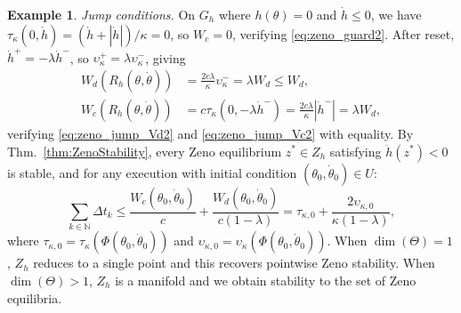 \documentclass[letterpaper, 10 pt, conference]{IEEEconf}
\theoremstyle{definition}
\newtheorem{example}[thm]{Example}
\newcommand{\N}{\mathbb N}
\begin{document}
\begin{example}
    \textit{Jump conditions.} On $G_h$ where $h(\theta) = 0$ and $\dot{h} \leq 0$, we have $\tau_\kappa(0, \dot{h}) = (\dot{h} + |\dot{h}|)/\kappa = 0$, so $W_c = 0$, verifying \eqref{eq:zeno_guard2}. After reset, $\dot{h}^+ = -\lambda\dot{h}^-$, so $\upsilon_\kappa^+ = \lambda\upsilon_\kappa^-$, giving
    \begin{align*}
        W_d(R_h(\theta, \dot\theta)) &= \frac{2c\lambda}{\kappa}\upsilon_\kappa^- = \lambda W_d \leq W_d,  \\
        W_c(R_h(\theta, \dot\theta)) &= c\tau_\kappa(0, -\lambda\dot{h}^-) = \frac{2c\lambda}{\kappa}|\dot{h}^-| = \lambda W_d, 
    \end{align*}
    verifying \eqref{eq:zeno_jump_Vd2} and \eqref{eq:zeno_jump_Vc2} with equality. By Thm.~\ref{thm:ZenoStability}, every Zeno equilibrium $z^* \in Z_h$ satisfying $\ddot{h}(z^*) < 0$ is stable, and for any execution with initial condition $(\theta_0, \dot\theta_0) \in U$:
    \begin{equation*}
        \sum_{k \in \N} \Delta t_k \leq \frac{W_c(\theta_0, \dot\theta_0)}{c} + \frac{W_d(\theta_0, \dot\theta_0)}{c(1-\lambda)} = \tau_{\kappa,0} + \frac{2\upsilon_{\kappa,0}}{\kappa(1-\lambda)},
    \end{equation*}
    where ${\tau_{\kappa,0} = \tau_\kappa(\Phi(\theta_0,\dot\theta_0))}$ and ${\upsilon_{\kappa,0} = \upsilon_\kappa(\Phi(\theta_0,\dot\theta_0))}$. When ${\dim(\Theta) = 1}$, $Z_h$ reduces to a single point and this recovers pointwise Zeno stability. When $\dim(\Theta) > 1$, $Z_h$ is a manifold and we obtain stability to the set of Zeno equilibria.
\end{example}




\end{document}
